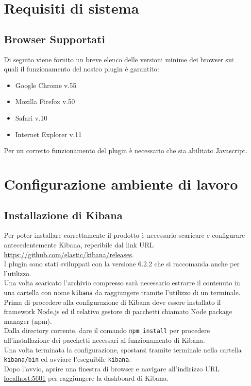 \section{Requisiti di sistema}
\subsection{Browser Supportati}

Di seguito viene fornito un breve elenco delle versioni minime dei browser sui quali il funzionamento del nostro plugin è garantito:
\begin{itemize}
	
	\item Google Chrome v.55
	\item Mozilla Firefox v.50
	\item Safari v.10
	\item Internet Explorer v.11
	
\end{itemize}

Per un corretto funzionamento del plugin è necessario che sia abilitato Javascript.




\section{Configurazione ambiente di lavoro}
\label{sec:configurazione}
\subsection{Installazione di Kibana}
Per poter installare correttamente il prodotto è necessario scaricare e configurare antecedentemente Kibana, reperibile dal link URL \url{https://github.com/elastic/kibana/releases}.\\
I plugin sono stati sviluppati con la versione 6.2.2 che si raccomanda anche per l'utilizzo.\\
Una volta scaricato l'archivio compresso sarà necessario estrarre il contenuto in una cartella con nome \texttt{kibana} da raggiungere tramite l'utilizzo di un terminale.
Prima di procedere alla configurazione di Kibana deve essere installato il framework Node.js ed il relativo gestore di pacchetti chiamato Node package manager (npm).\\
Dalla directory corrente, dare il comando \texttt{npm install} per procedere all'installazione dei pacchetti necessari al funzionamento di Kibana.\\
Una volta terminata la configurazione, spostarsi tramite terminale nella cartella \texttt{kibana/bin} ed avviare l'eseguibile \texttt{kibana}.\\
Dopo l'avvio, aprire una finestra di browser e navigare all'indirizzo URL \url{localhost:5601} per raggiungere la dashboard di Kibana.
